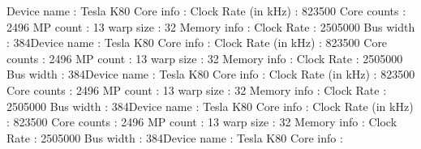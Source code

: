 \documentclass{article}
\begin{document}
Device name : Tesla K80 \newline
  Core info :\newline
    Clock Rate (in kHz) : 823500\newline
    Core counts : 2496\newline
    MP count : 13\newline
    warp size : 32\newline
  Memory info :\newline
    Clock Rate : 2505000 Bus width : 384\newline\newline Device name : Tesla K80\newline
  Core info :\newline
    Clock Rate (in kHz) : 823500\newline
    Core counts : 2496\newline
    MP count : 13\newline
    warp size : 32\newline
  Memory info :\newline
    Clock Rate : 2505000 Bus width : 384\newline\newline Device name : Tesla K80\newline
  Core info :\newline
    Clock Rate (in kHz) : 823500\newline
    Core counts : 2496\newline
    MP count : 13\newline
    warp size : 32\newline
  Memory info :\newline
    Clock Rate : 2505000 Bus width : 384\newline\newline Device name : Tesla K80\newline
  Core info :\newline
    Clock Rate (in kHz) : 823500\newline
    Core counts : 2496\newline
    MP count : 13\newline
    warp size : 32\newline
  Memory info :\newline
    Clock Rate : 2505000 Bus width : 384\newline\newline Device name : Tesla K80\newline
  Core info :\newline
\end{document}
